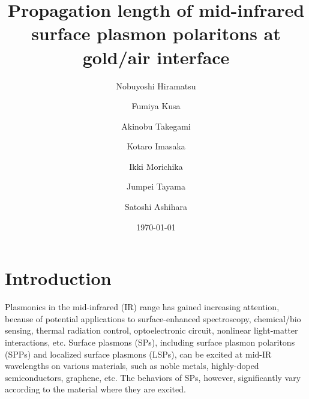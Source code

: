 \documentclass[aip,apl,reprint]{revtex4-1}
\begin{document}
\title{Propagation length of mid-infrared surface plasmon polaritons at gold/air interface}
\author{Nobuyoshi Hiramatsu}
\author{Fumiya Kusa}
\author{Akinobu Takegami}
\author{Kotaro Imasaka}
\author{Ikki Morichika}
\author{Jumpei Tayama}
\author{Satoshi Ashihara}

\date{\today}

\maketitle

\section{Introduction}

Plasmonics in the mid-infrared (IR) range has gained increasing attention\cite{Stanley, Law}, because of potential applications to surface-enhanced spectroscopy\cite{Neubrech, Hoang}, chemical/bio sensing\cite{Cleary2008}, thermal radiation control\cite{Kusunoki}, optoelectronic circuit\cite{Ebbesen, Soref}, nonlinear light-matter interactions\cite{Kusa2015}, etc. Surface plasmons (SPs), including surface plasmon polaritons (SPPs) and localized surface plasmons (LSPs), can be excited at mid-IR wavelengths on various materials, such as noble metals, highly-doped semiconductors, graphene, etc\cite{Law}. The behaviors of SPs, however, significantly vary according to the material where they are excited. 
\end{document}
